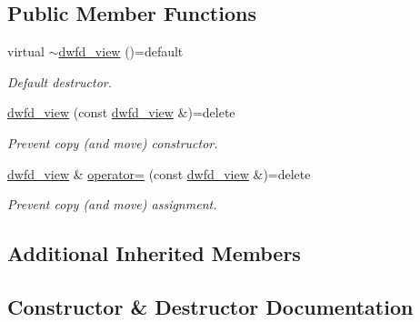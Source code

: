 \subsection*{Public Member Functions}
\begin{DoxyCompactItemize}
\item 
virtual \hyperlink{classUintah_1_1PhaseField_1_1detail_1_1dwfd__view_3_01ScalarField_3_01T_01_4_00_01STN_00_01VAR_01_4_a8ec15da1225cea89111fb7fa279f929c}{$\sim$dwfd\+\_\+view} ()=default
\begin{DoxyCompactList}\small\item\em Default destructor. \end{DoxyCompactList}\item 
\hyperlink{classUintah_1_1PhaseField_1_1detail_1_1dwfd__view_3_01ScalarField_3_01T_01_4_00_01STN_00_01VAR_01_4_a09d1b78273bc5111d169326c7ed6e84d}{dwfd\+\_\+view} (const \hyperlink{classUintah_1_1PhaseField_1_1detail_1_1dwfd__view}{dwfd\+\_\+view} \&)=delete
\begin{DoxyCompactList}\small\item\em Prevent copy (and move) constructor. \end{DoxyCompactList}\item 
\hyperlink{classUintah_1_1PhaseField_1_1detail_1_1dwfd__view}{dwfd\+\_\+view} \& \hyperlink{classUintah_1_1PhaseField_1_1detail_1_1dwfd__view_3_01ScalarField_3_01T_01_4_00_01STN_00_01VAR_01_4_ae96d77062c8797072749a962f002a03c}{operator=} (const \hyperlink{classUintah_1_1PhaseField_1_1detail_1_1dwfd__view}{dwfd\+\_\+view} \&)=delete
\begin{DoxyCompactList}\small\item\em Prevent copy (and move) assignment. \end{DoxyCompactList}\end{DoxyCompactItemize}
\subsection*{Additional Inherited Members}


\subsection{Constructor \& Destructor Documentation}
\mbox{\label{classUintah_1_1PhaseField_1_1detail_1_1dwfd__view_3_01ScalarField_3_01T_01_4_00_01STN_00_01VAR_01_4_a8ec15da1225cea89111fb7fa279f929c}} 
